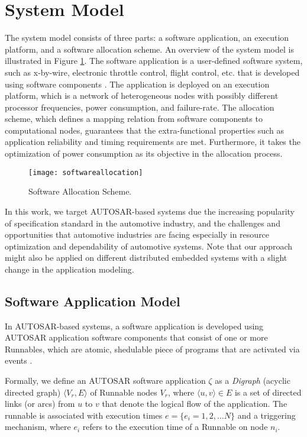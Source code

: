 \section{System Model}\label{sec_system}
The system model consists of three parts: a software application, an execution platform, and a software allocation scheme. An overview of the system model is illustrated in Figure \ref{fig_softwareallocation}. The software application is a user-defined software system, such as x-by-wire, electronic throttle control, flight control, etc. that is developed using software components \cite{softwarecomponents}\cite{Crnkovic2002BuildingSystems}. The application is deployed on an execution platform, which is a network of heterogeneous nodes with possibly different processor frequencies, power consumption, and failure-rate. The allocation scheme, which defines a mapping relation from software components to computational nodes, guarantees that the extra-functional properties such as application reliability and timing requirements are met. Furthermore, it takes the optimization of power consumption as its objective in the allocation process.
\begin{figure}[!h]
\centering
\texttt{[image: softwareallocation]}
\caption{Software Allocation Scheme.}
\label{fig_softwareallocation}
\end{figure}

In this work, we target AUTOSAR-based systems due the increasing popularity of specification standard in  the automotive industry, and the challenges and opportunities that automotive industries are facing especially in resource optimization and dependability of automotive systems. Note that our approach might also be applied on different distributed embedded systems with a slight change in the application modeling.

\subsection{Software Application Model}
In AUTOSAR-based systems, a software application is developed using AUTOSAR application software components that consist of one or more Runnables, which are atomic, shedulable piece of programs that are activated via events \cite{Schreiner2007ABus}.
\begin{definition}
Formally, we define an AUTOSAR software application $\zeta$ as a \textit{Digraph} (acyclic directed graph) $\langle V_r, E\rangle$ of Runnable nodes $V_r$, where $\langle u,v\rangle\in E$ is a set of directed links (or arcs) from $u$ to $v$ that denote the logical flow of the application. The runnable is associated with execution times $e=\{e_i=1,2,\dots N\}$ and a triggering mechanism, where $e_i$ refers to the execution time of a Runnable on node $n_i$. 
\end{definition}
 
